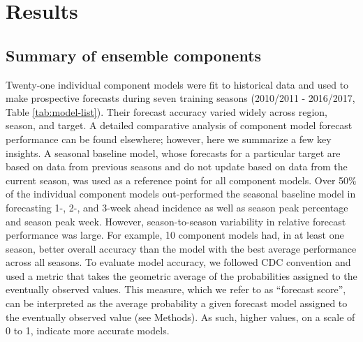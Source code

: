 \documentclass{article}\usepackage[]{graphicx}\usepackage[]{color}
\begin{document}
\section{Results}

\subsection{Summary of ensemble components} \label{subsec:comp-models}




Twenty-one individual component models were fit to historical data and used to make prospective forecasts during seven training seasons (2010/2011 - 2016/2017, Table \ref{tab:model-list}). 
Their forecast accuracy varied widely across region, season, and target.
A detailed comparative analysis of component model forecast performance can be found elsewhere\cite{Reich2018}; however, here we summarize a few key insights.
A seasonal baseline model, whose forecasts for a particular target are based on data from previous seasons and do not update based on data from the current season, was used as a reference point for all component models.
Over 50\% of the individual component models out-performed the seasonal baseline model in forecasting 1-, 2-, and 3-week ahead incidence as well as season peak percentage and season peak week.
However, season-to-season variability in relative forecast performance was large.
For example, 10 component models had, in at least one season, better overall accuracy than the model with the best average performance across all seasons. 
To evaluate model accuracy, we followed CDC convention and used a metric that takes the geometric average of the probabilities assigned to the eventually observed values. 
This measure, which we refer to as ``forecast score'', can be interpreted as the average probability a given forecast model assigned to the eventually observed value  (see Methods).
As such, higher values, on a scale of 0 to 1, indicate more accurate models.

\end{document}
